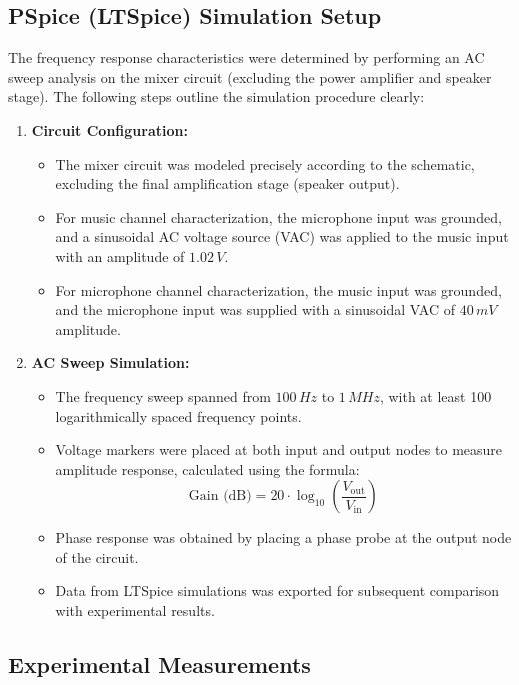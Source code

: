 \documentclass[12pt]{article}
\begin{document}
\subsection{PSpice (LTSpice) Simulation Setup}

The frequency response characteristics were determined by performing an AC sweep analysis on the mixer circuit (excluding the power amplifier and speaker stage). The following steps outline the simulation procedure clearly:

\begin{enumerate}
	\item \textbf{Circuit Configuration:}
	      \begin{itemize}
		      \item The mixer circuit was modeled precisely according to the schematic, excluding the final amplification stage (speaker output).
		      \item For music channel characterization, the microphone input was grounded, and a sinusoidal AC voltage source (VAC) was applied to the music input with an amplitude of $1.02\,V$.
		      \item For microphone channel characterization, the music input was grounded, and the microphone input was supplied with a sinusoidal VAC of $40\,mV$ amplitude.
	      \end{itemize}

	\item \textbf{AC Sweep Simulation:}
	      \begin{itemize}
		      \item The frequency sweep spanned from $100\,Hz$ to $1\,MHz$, with at least 100 logarithmically spaced frequency points.
		      \item Voltage markers were placed at both input and output nodes to measure amplitude response, calculated using the formula:
		            \[
			            \text{Gain (dB)} = 20 \cdot \log_{10}\left(\frac{V_{\text{out}}}{V_{\text{in}}}\right)
		            \]
		      \item Phase response was obtained by placing a phase probe at the output node of the circuit.
		      \item Data from LTSpice simulations was exported for subsequent comparison with experimental results.
	      \end{itemize}
\end{enumerate}

\subsection{Experimental Measurements}
\end{document}
